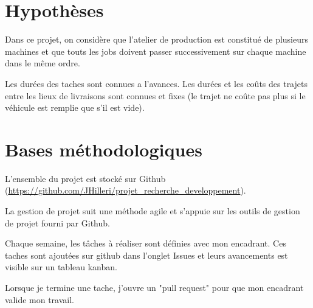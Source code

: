 \section{Hypothèses}
Dans ce projet, on considère que l'atelier de production est constitué de plusieurs machines et que touts les jobs doivent passer successivement sur chaque machine dans le même ordre.

Les durées des taches sont connues a l'avances.
Les durées et les coûts des trajets entre les lieux de livraisons sont connues et fixes (le trajet ne coûte pas plus si le véhicule est remplie que s'il est vide).


\section{Bases méthodologiques}
L'ensemble du projet est stocké sur Github (\url{https://github.com/JHilleri/projet_recherche_developpement}).

La gestion de projet suit une méthode agile et s'appuie sur les outils de gestion de projet fourni par Github.

Chaque semaine, les tâches à réaliser sont définies avec mon encadrant.
Ces taches sont ajoutées sur github dans l'onglet Issues et leurs avancements est visible sur un tableau kanban.

Lorsque je termine une tache, j'ouvre un "pull request" pour que mon encadrant valide mon travail.
